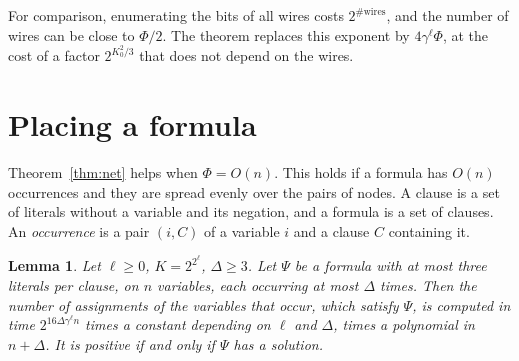 \documentclass[11pt]{article}
\newtheorem{lemma}{Lemma}
\begin{document}
For comparison, enumerating the bits of all wires costs $2^{\#\text{wires}}$, and the number of wires can be close to $\Phi/2$. The theorem replaces this exponent by $4\gamma^\ell\Phi$, at the cost of a factor $2^{K_0^2/3}$ that does not depend on the wires.

\section{Placing a formula}\label{sec:place}

Theorem~\ref{thm:net} helps when $\Phi=O(n)$. This holds if a formula has $O(n)$ occurrences and they are spread evenly over the pairs of nodes. A clause is a set of literals without a variable and its negation, and a formula is a set of clauses. An \emph{occurrence} is a pair $(i,C)$ of a variable $i$ and a clause $C$ containing it.

\begin{lemma}\label{lem:count}
Let $\ell\ge0$, $K=2^{2^\ell}$, $\Delta\ge3$. Let $\Psi$ be a formula with at most three literals per clause, on $n$ variables, each occurring at most $\Delta$ times. Then the number of assignments of the variables that occur, which satisfy $\Psi$, is computed in time $2^{16\Delta\gamma^\ell n}$ times a constant depending on $\ell$ and $\Delta$, times a polynomial in $n+\Delta$. It is positive if and only if $\Psi$ has a solution.
\end{lemma}
\end{document}
